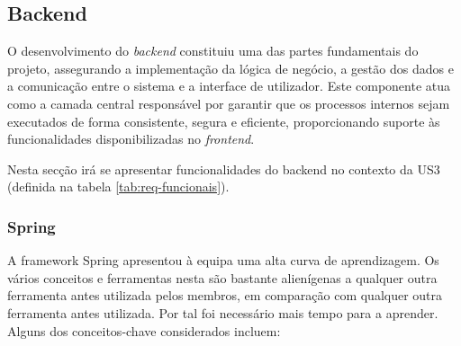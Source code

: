 \subsection{Backend}

O desenvolvimento do \textit{backend} constituiu uma das partes fundamentais do projeto, assegurando a implementação da lógica de negócio, a gestão dos dados e a comunicação entre o sistema e a interface de utilizador. Este componente atua como a camada central responsável por garantir que os processos internos sejam executados de forma consistente, segura e eficiente, proporcionando suporte às funcionalidades disponibilizadas no \textit{frontend}.  

Nesta secção irá se apresentar funcionalidades do backend no contexto da US3 (definida na tabela \ref{tab:req-funcionais}).







\subsubsection{Spring}
\label{sec:backend-Spring}

A framework Spring apresentou à equipa uma alta curva de aprendizagem. Os vários conceitos e ferramentas nesta são bastante alienígenas a qualquer outra ferramenta antes utilizada pelos membros, em comparação com qualquer outra ferramenta antes utilizada. Por tal foi necessário mais tempo para a aprender. Alguns dos conceitos-chave considerados incluem:

